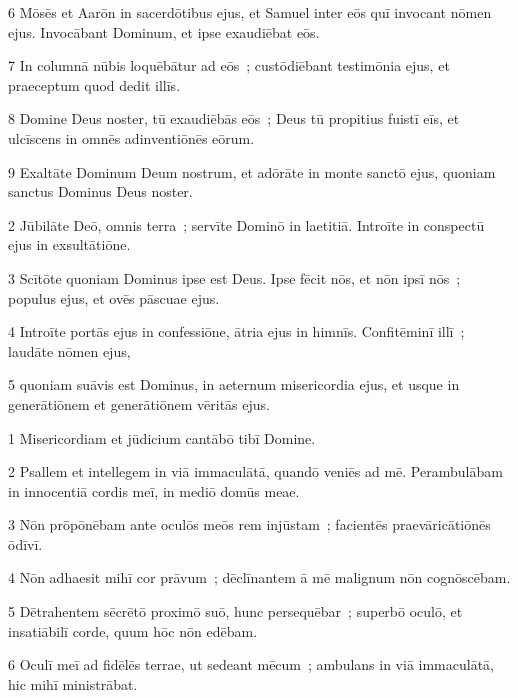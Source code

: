 \psalmVerse
  {\phantom{00}6}
  {Mōsēs et Aarōn in sacerdōtibus ejus, et Samuel inter eōs quī invocant nōmen ejus. Invocābant Dominum, et ipse exaudiēbat eōs.}


\psalmVerse
  {\phantom{00}7}
  {In columnā nūbis loquēbātur ad eōs~; custōdiēbant testimōnia ejus, et praeceptum quod dedit illīs.}


\psalmVerse
  {\phantom{00}8}
  {Domine Deus noster, tū exaudiēbās eōs~; Deus tū propitius fuistī eīs, et ulcīscens in omnēs adinventiōnēs eōrum.}


\psalmVerse
  {\phantom{00}9}
  {Exaltāte Dominum Deum nostrum, et adōrāte in monte sanctō ejus, quoniam sanctus Dominus Deus noster.}



\psalmVerse
  {\phantom{00}2}
  {Jūbilāte Deō, omnis terra~; servīte Dominō in laetitiā. Introīte in conspectū ejus in exsultātiōne.}


\psalmVerse
  {\phantom{00}3}
  {Scītōte quoniam Dominus ipse est Deus. Ipse fēcit nōs, et nōn ipsī nōs~; populus ejus, et ovēs pāscuae ejus.}


\psalmVerse
  {\phantom{00}4}
  {Introīte portās ejus in confessiōne, ātria ejus in himnīs. Confitēminī illī~; laudāte nōmen ejus,}


\psalmVerse
  {\phantom{00}5}
  {quoniam suāvis est Dominus, in aeternum misericordia ejus, et usque in generātiōnem et generātiōnem vēritās ejus.}



\psalmVerse
  {\phantom{00}1}
  {Misericordiam et jūdicium cantābō tibī Domine.}


\psalmVerse
  {\phantom{00}2}
  {Psallem et intellegem in viā immaculātā, quandō veniēs ad mē. Perambulābam in innocentiā cordis meī, in mediō domūs meae.}


\psalmVerse
  {\phantom{00}3}
  {Nōn prōpōnēbam ante oculōs meōs rem injūstam~; facientēs praevāricātiōnēs ōdīvī.}


\psalmVerse
  {\phantom{00}4}
  {Nōn adhaesit mihī cor prāvum~; dēclīnantem ā mē malignum nōn cognōscēbam.}


\psalmVerse
  {\phantom{00}5}
  {Dētrahentem sēcrētō proximō suō, hunc persequēbar~; superbō oculō, et insatiābilī corde, quum hōc nōn edēbam.}


\psalmVerse
  {\phantom{00}6}
  {Oculī meī ad fidēlēs terrae, ut sedeant mēcum~; ambulans in viā immaculātā, hic mihī ministrābat.}


